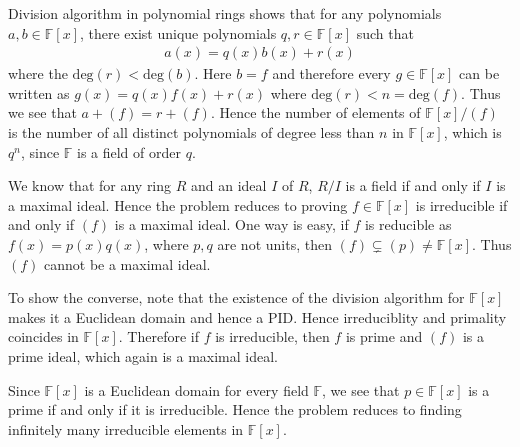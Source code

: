 \documentclass[12pt]{exam}
\theoremstyle{plain} %
\theoremstyle{definition} %
\theoremstyle{remark} %
\begin{document}
\begin{questions}
  \question
  \begin{solution}
    Division algorithm in polynomial rings shows that for any
    polynomials $a, b \in \mathbb{F}[x]$, there exist unique
    polynomials $q, r \in \mathbb{F}[x]$ such that
    \begin{align*}
      a(x) = q(x) b(x) + r(x)
    \end{align*}
    where the $\textrm{deg}(r)< \textrm{deg}(b)$. Here $b = f$ and
    therefore every $g \in \mathbb{F}[x]$ can be written as $g(x) =
    q(x) f(x) + r(x)$ where $\textrm{deg}(r) < n = \textrm{deg}(f)$.
    Thus we see that $a + (f) = r + (f)$. Hence the number of
    elements of $\mathbb{F}[x]/(f)$ is the number of all distinct
    polynomials of degree less than $n$ in $\mathbb{F}[x]$, which is
    $q^n$, since $\mathbb{F}$ is a field of order $q$.
  \end{solution}

  \question
  \begin{solution}
    We know that for any ring $R$ and an ideal $I$ of $R$, $R/I$ is a
    field if and only if $I$ is a maximal ideal. Hence the problem
    reduces to proving $f \in \mathbb{F}[x]$ is irreducible if and
    only if $(f)$ is a maximal ideal. One way is easy, if $f$ is
    reducible as $f(x) = p(x) q(x)$, where $p, q$ are not units, then
    $(f) \subsetneq (p) \neq \mathbb{F}[x]$. Thus $(f)$ cannot be a
    maximal ideal.

    To show the converse, note that the existence of the division
    algorithm for $\mathbb{F}[x]$ makes it a Euclidean domain and
    hence a PID. Hence irreduciblity and primality coincides in
    $\mathbb{F}[x]$. Therefore if $f$ is irreducible, then $f$ is
    prime and $(f)$ is a prime ideal, which again is a maximal ideal.
  \end{solution}

  \question
  \begin{solution}
    Since $\mathbb{F}[x]$ is a Euclidean domain for every field
    \label{fields_have_infinte_primes}
    $\mathbb{F}$, we see that $p \in \mathbb{F}[x]$ is a prime if and
    only if it is irreducible. Hence the problem reduces to finding
    infinitely many irreducible elements in $\mathbb{F}[x]$.


\end{solution}
\end{questions}
\end{document}
